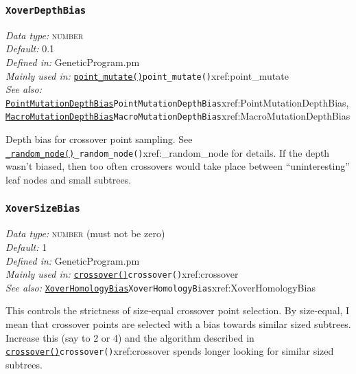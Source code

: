 \documentclass[a4paper]{article}
\begin{document}
\subsubsection{\texttt{XoverDepthBias}}\label{xref:XoverDepthBias}
\begin{flushleft}
\textit{Data type:} \textsc{number}\\
\textit{Default:} 0.1\\
\textit{Defined in:} GeneticProgram.pm\\
\textit{Mainly used in:} \hyperref[no]{\texttt{point\_mutate()}}{\texttt{point\_mutate()}}{xref:point_mutate}\\
\textit{See also:} \hyperref[no]{\texttt{PointMutationDepthBias}}{\texttt{PointMutationDepthBias}}{xref:PointMutationDepthBias}, \hyperref[no]{\texttt{MacroMutationDepthBias}}{\texttt{MacroMutationDepthBias}}{xref:MacroMutationDepthBias}
\end{flushleft}

Depth bias for crossover point sampling.  See
\hyperref[no]{\texttt{\_random\_node()}}{\texttt{\_random\_node()}}{xref:_random_node} for details.  If the depth wasn't biased,
then too often crossovers would take place between ``uninteresting''
leaf nodes and small subtrees.

\subsubsection{\texttt{XoverSizeBias}}\label{xref:XoverSizeBias}
\begin{flushleft}
\textit{Data type:} \textsc{number} (must not be zero)\\
\textit{Default:} 1\\
\textit{Defined in:} GeneticProgram.pm\\
\textit{Mainly used in:} \hyperref[no]{\texttt{crossover()}}{\texttt{crossover()}}{xref:crossover}\\
\textit{See also:} \hyperref[no]{\texttt{XoverHomologyBias}}{\texttt{XoverHomologyBias}}{xref:XoverHomologyBias}
\end{flushleft}

This controls the strictness of size-equal crossover point selection.
By size-equal, I mean that crossover points are selected with a bias
towards similar sized subtrees.  Increase this (say to 2 or 4) and the
algorithm described in \hyperref[no]{\texttt{crossover()}}{\texttt{crossover()}}{xref:crossover} spends longer looking for
similar sized subtrees.
\end{document}
